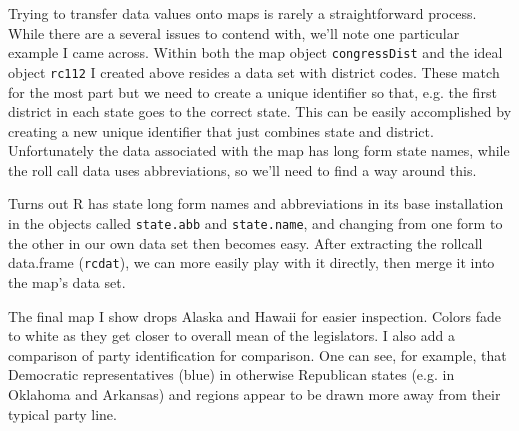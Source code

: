 \documentclass[english,nohyper,titlepage]{tufte-handout}\usepackage[]{graphicx}\usepackage[]{color}
\begin{document}
Trying to transfer data values onto maps is rarely a straightforward process.  While there are a several issues to contend with, we'll note one particular example I came across.  Within both the map object \texttt{congressDist} and the ideal object \texttt{rc112} I created above resides a data set with district codes.  These match for the most part but we need to create a unique identifier so that, e.g. the first district in each state goes to the correct state.  This can be easily accomplished by creating a new unique identifier that just combines state and district.  Unfortunately the data associated with the map has long form state names, while the roll call data uses abbreviations, so we'll need to find a way around this.

Turns out R has state long form names and abbreviations in its base installation in the objects called \texttt{state.abb} and \texttt{state.name}, and changing from one form to the other in our own data set then becomes easy.  After extracting the rollcall data.frame (\texttt{rcdat}), we can more easily play with it directly, then merge it into the map's data set.

The final map I show drops Alaska and Hawaii for easier inspection. Colors fade to white as they get closer to overall mean of the legislators.  I also add a comparison of party identification for comparison.  One can see, for example, that Democratic representatives (blue) in otherwise Republican states (e.g. in Oklahoma and Arkansas) and regions appear to be drawn more away from their typical party line.


\end{document}
